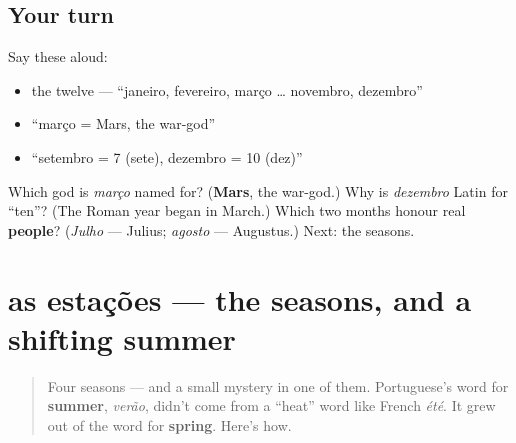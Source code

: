 \subsection*{Your turn}
Say these aloud:

\begin{itemize}
\raggedright
  \item the twelve — \textquotedblleft{}janeiro, fevereiro, março … novembro, dezembro\textquotedblright{}
  \item \textquotedblleft{}março = Mars, the war-god\textquotedblright{}
  \item \textquotedblleft{}setembro = 7 (sete), dezembro = 10 (dez)\textquotedblright{}
\end{itemize}

\begin{tcolorbox}[breakable,colback=teal!4,colframe=teal!35!black,title={Before you move on}]
Which god is \emph{março} named for? (\textbf{Mars}, the war-god.) Why is \emph{dezembro} Latin for \textquotedblleft{}ten\textquotedblright{}? (The Roman year began in March.) Which two months honour real \textbf{people}? (\emph{Julho} — Julius; \emph{agosto} — Augustus.) Next: the seasons.
\end{tcolorbox}
\section[as estações]{as estações — the seasons, and a shifting summer}

\label{lesson:PT-C09-estacoes}



\begin{quote}
Four seasons — and a small mystery in one of them. Portuguese's word for \textbf{summer}, \emph{verão}, didn't come from a \textquotedblleft{}heat\textquotedblright{} word like French \emph{été}. It grew out of the word for \textbf{spring}. Here's how.
\end{quote}

